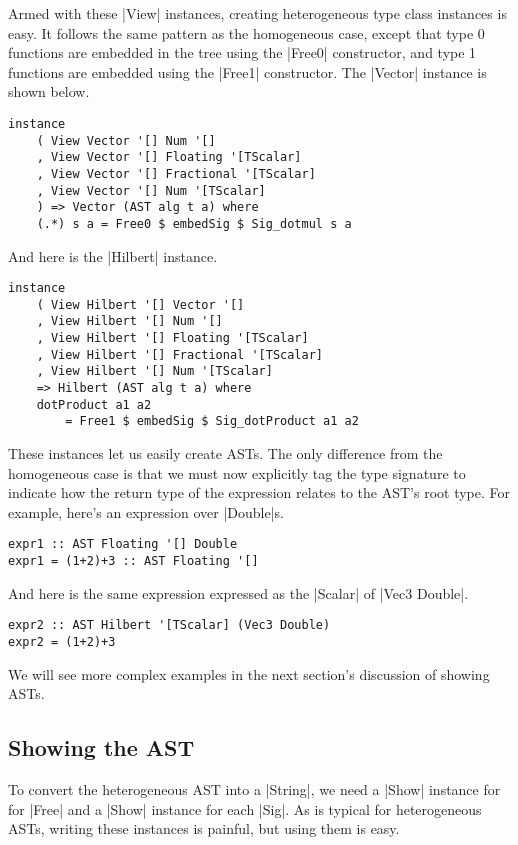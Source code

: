 \documentclass[preprint]{sigplanconf}
\theoremstyle{definition}
\begin{document}
Armed with these |View| instances, creating heterogeneous type class instances is easy.
It follows the same pattern as the homogeneous case,
except that type 0 functions are embedded in the tree using the |Free0| constructor,
and type 1 functions are embedded using the |Free1| constructor.
The |Vector| instance is shown below.
\begin{lstlisting}
instance
    ( View Vector '[] Num '[]
    , View Vector '[] Floating '[TScalar]
    , View Vector '[] Fractional '[TScalar]
    , View Vector '[] Num '[TScalar]
    ) => Vector (AST alg t a) where
    (.*) s a = Free0 $ embedSig $ Sig_dotmul s a
\end{lstlisting}
And here is the |Hilbert| instance.
\begin{lstlisting}
instance
    ( View Hilbert '[] Vector '[]
    , View Hilbert '[] Num '[]
    , View Hilbert '[] Floating '[TScalar]
    , View Hilbert '[] Fractional '[TScalar]
    , View Hilbert '[] Num '[TScalar]
    => Hilbert (AST alg t a) where
    dotProduct a1 a2
        = Free1 $ embedSig $ Sig_dotProduct a1 a2
\end{lstlisting}

These instances let us easily create ASTs.
The only difference from the homogeneous case is that we must now explicitly tag the type signature to indicate how the return type of the expression relates to the AST's root type.
For example, here's an expression over |Double|s.
\begin{lstlisting}
expr1 :: AST Floating '[] Double
expr1 = (1+2)+3 :: AST Floating '[]
\end{lstlisting}
And here is the same expression expressed as the |Scalar| of |Vec3 Double|.
\begin{lstlisting}
expr2 :: AST Hilbert '[TScalar] (Vec3 Double)
expr2 = (1+2)+3
\end{lstlisting}
We will see more complex examples in the next section's discussion of showing ASTs.

\subsection{Showing the AST}

To convert the heterogeneous AST into a |String|,
we need a |Show| instance for for |Free| and a |Show| instance for each |Sig|.
As is typical for heterogeneous ASTs,
writing these instances is painful,
but using them is easy.
\end{document}
